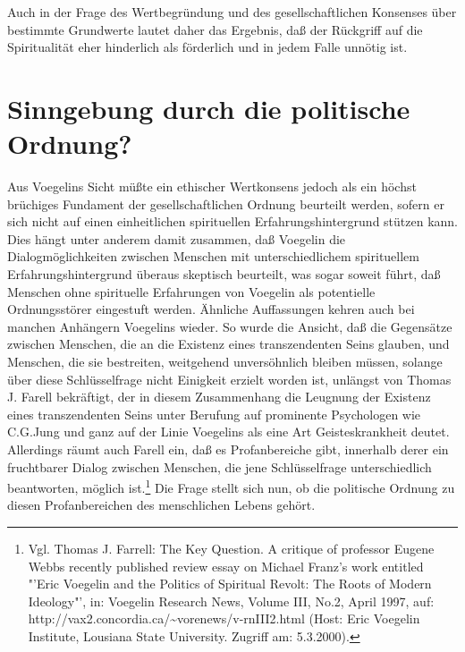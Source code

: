 Auch in der Frage des Wertbegründung und des gesellschaftlichen
Konsenses über bestimmte Grundwerte lautet daher das Ergebnis, daß der
Rückgriff auf die Spiritualität eher hinderlich als förderlich und in
jedem Falle unnötig ist.


\section{Sinngebung durch die politische Ordnung?}

Aus Voegelins Sicht müßte ein ethischer Wertkonsens jedoch als ein höchst
brüchiges Fundament der gesellschaftlichen Ordnung beurteilt werden, sofern er
sich nicht auf einen einheitlichen spirituellen Erfahrungshintergrund stützen
kann. Dies hängt unter anderem damit zusammen, daß Voegelin die
Dialogmöglichkeiten zwischen Menschen mit unterschiedlichem spirituellem
Erfahrungshintergrund überaus skeptisch beurteilt, was sogar soweit führt, daß
Menschen ohne spirituelle Erfahrungen von Voegelin als potentielle
Ordnungsstörer eingestuft werden. Ähnliche Auffassungen kehren auch bei
manchen Anhängern Voegelins wieder. So wurde die Ansicht, daß die Gegensätze
zwischen Menschen, die an die Existenz eines transzendenten Seins glauben, und
Menschen, die sie bestreiten, weitgehend unversöhnlich bleiben müssen, solange
über diese Schlüsselfrage nicht Einigkeit erzielt worden ist, unlängst von
Thomas J. Farell bekräftigt, der in diesem Zusammenhang die Leugnung der
Existenz eines transzendenten Seins unter Berufung auf prominente Psychologen
wie C.G.Jung und ganz auf der Linie Voegelins als eine Art Geisteskrankheit
deutet. Allerdings räumt auch Farell ein, daß es Profanbereiche gibt,
innerhalb derer ein fruchtbarer Dialog zwischen Menschen, die jene
Schlüsselfrage unterschiedlich beantworten, möglich ist.\footnote{Vgl. Thomas
  J.  Farrell: The Key Question. A critique of professor Eugene Webbs recently
  published review essay on Michael Franz's work entitled "'Eric Voegelin and
  the Politics of Spiritual Revolt: The Roots of Modern Ideology"', in:
  Voegelin Research News, Volume III, No.2, April 1997, auf:
  http://vax2.concordia.ca/\~{ }vorenews/v-rnIII2.html (Host: Eric Voegelin
  Institute, Lousiana State University. Zugriff am: 5.3.2000).} Die Frage
stellt sich nun, ob die politische Ordnung zu diesen Profanbereichen des
menschlichen Lebens gehört.

